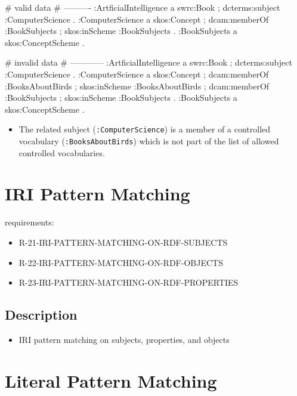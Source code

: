 \documentclass{llncs}
\newcommand{\ms}[1]{\texttt{#1}}
\begin{document}
\begin{ex}
# valid data
# ----------
:ArtficialIntelligence
    a swrc:Book ;
    dcterms:subject :ComputerScience .
:ComputerScience
    a skos:Concept ;
    dcam:memberOf :BookSubjects ;
    skos:inScheme :BookSubjects .
:BookSubjects
    a skos:ConceptScheme .
\end{ex}

\begin{ex}
# invalid data
# ------------
:ArtficialIntelligence
    a swrc:Book ;
    dcterms:subject :ComputerScience .
:ComputerScience
    a skos:Concept ;
    dcam:memberOf :BooksAboutBirds ;
    skos:inScheme :BooksAboutBirds ;
    dcam:memberOf :BookSubjects ;
    skos:inScheme :BookSubjects .
:BookSubjects
    a skos:ConceptScheme .
\end{ex}

\begin{itemize}
	\item The related subject (\ms{:ComputerScience}) is a member of a controlled vocabulary (\ms{:BooksAboutBirds}) 
which is not part of the list of allowed controlled vocabularies.
\end{itemize}

\section{IRI Pattern Matching}

requirements:

\begin{itemize}
	\item R-21-IRI-PATTERN-MATCHING-ON-RDF-SUBJECTS
  \item R-22-IRI-PATTERN-MATCHING-ON-RDF-OBJECTS
  \item R-23-IRI-PATTERN-MATCHING-ON-RDF-PROPERTIES
\end{itemize}

\subsection{Description}

\begin{itemize}
	\item IRI pattern matching on subjects, properties, and objects
\end{itemize}

\section{Literal Pattern Matching}
\end{document}
